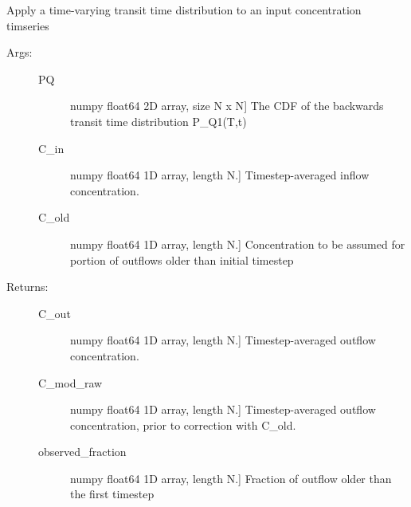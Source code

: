 \documentclass[letterpaper,10pt,english]{sphinxmanual}
\begin{document}
\begin{fulllineitems}
\label{index:rsas.transport}
Apply a time-varying transit time distribution to an input concentration timseries
\begin{description}
\item[{Args:}] \leavevmode\begin{description}
\item[{PQ}] \leavevmode{[}numpy float64 2D array, size N x N{]}
The CDF of the backwards transit time distribution P\_Q1(T,t)

\item[{C\_in}] \leavevmode{[}numpy float64 1D array, length N.{]}
Timestep-averaged inflow concentration.

\item[{C\_old}] \leavevmode{[}numpy float64 1D array, length N.{]}
Concentration to be assumed for portion of outflows older than initial
timestep

\end{description}

\item[{Returns:}] \leavevmode\begin{description}
\item[{C\_out}] \leavevmode{[}numpy float64 1D array, length N.{]}
Timestep-averaged outflow concentration.

\item[{C\_mod\_raw}] \leavevmode{[}numpy float64 1D array, length N.{]}
Timestep-averaged outflow concentration, prior to correction with C\_old.

\item[{observed\_fraction}] \leavevmode{[}numpy float64 1D array, length N.{]}
Fraction of outflow older than the first timestep

\end{description}

\end{description}

\end{fulllineitems}

\end{document}
